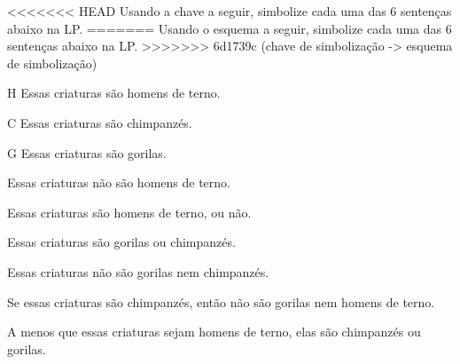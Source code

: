 \practiceproblems
\solutions
<<<<<<< HEAD
\problempart Usando a chave a seguir, simbolize cada uma das 6 sentenças abaixo na LP.\label{pr.monkeysuits}
=======
\problempart Usando o esquema a seguir, simbolize cada uma das 6 sentenças abaixo na LP.\label{pr.monkeysuits}
>>>>>>> 6d1739c (chave de simbolização -> esquema de simbolização)
	\begin{ekey}
		\item[H] Essas criaturas são homens de terno. 
		\item[C] Essas criaturas são chimpanzés.
		\item[G] Essas criaturas são gorilas.
	\end{ekey}
\begin{earg}
	\item Essas criaturas não são homens de terno.
	\item Essas criaturas são homens de terno, ou não.
	\item Essas criaturas são gorilas ou chimpanzés.
	\item Essas criaturas não são gorilas nem chimpanzés.
	\item Se essas criaturas são chimpanzés, então não são gorilas nem homens de terno.
	\item A menos que essas criaturas sejam homens de terno, elas são chimpanzés ou gorilas.
\end{earg}

